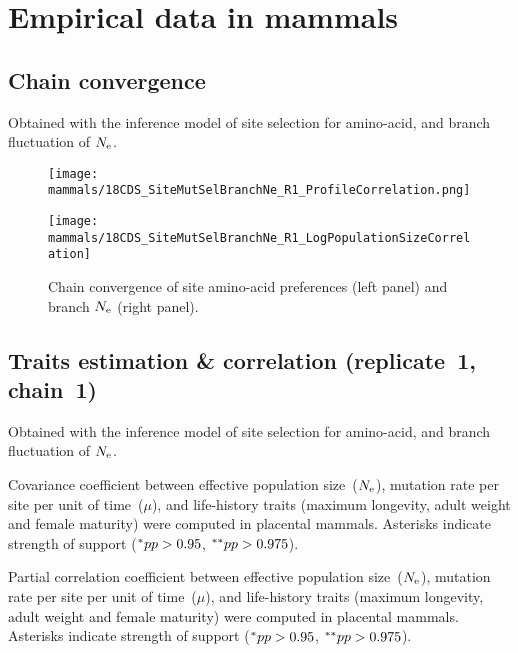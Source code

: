 \section{Empirical data in mammals}
\label{sec:empirical-data-in-mammals}

\subsection{Chain convergence}
\label{subsec:chain-convergence}
Obtained with the inference model of site selection for amino-acid, and branch fluctuation of $\Ne$.

\begin{figure}[H]
    \centering
    \begin{minipage}{0.49\linewidth}
        \texttt{[image: mammals/18CDS\_SiteMutSelBranchNe\_R1\_ProfileCorrelation.png]}
    \end{minipage} \hfill
    \begin{minipage}{0.49\linewidth}
        \texttt{[image: mammals/18CDS\_SiteMutSelBranchNe\_R1\_LogPopulationSizeCorrelation]}
    \end{minipage}
    \caption[Chain convergence of site profiles and branche $\Ne$]{
    Chain convergence of site amino-acid preferences (left panel) and branch $\Ne$ (right panel).}
\end{figure}

\subsection{Traits estimation \& correlation (replicate~1, chain~1)}
Obtained with the inference model of site selection for amino-acid, and branch fluctuation of $\Ne$.

\begin{table}[H]
    
    \caption[Covariance matrix in mammals]{
    Covariance coefficient between effective population size~($\Ne$), mutation rate per site per unit of time~($\mu$), and life-history traits (maximum longevity, adult weight and female maturity) were computed in placental mammals.
    Asterisks indicate strength of support ($\smash{^{*}} pp > 0.95$, $\smash{^{**}} pp > 0.975$).}
\end{table}

\begin{table}[H]
    
    \caption[Partial correlation coefficient matrix in mammals]{
    Partial correlation coefficient between effective population size~($\Ne$), mutation rate per site per unit of time~($\mu$), and life-history traits (maximum longevity, adult weight and female maturity) were computed in placental mammals.
    Asterisks indicate strength of support ($\smash{^{*}} pp > 0.95$, $\smash{^{**}} pp > 0.975$).}
    \label{tab:table-partcor-mammals}
\end{table}

